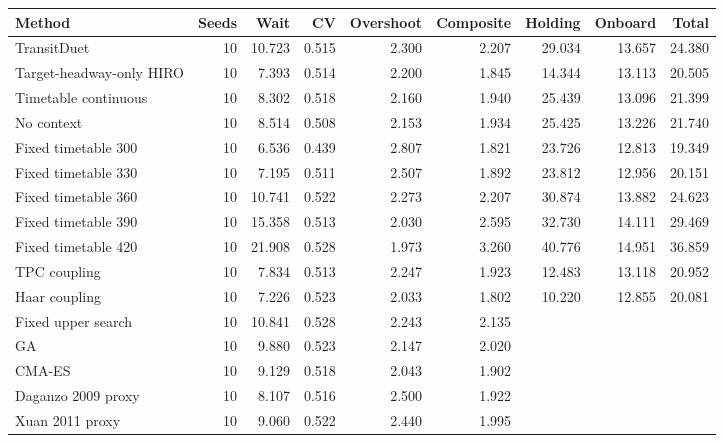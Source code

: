 \begin{tabular}{lrrrrrrrr}
\toprule
Method & Seeds & Wait & CV & Overshoot & Composite & Holding & Onboard & Total \\
\midrule
TransitDuet & 10 & 10.723 & 0.515 & 2.300 & 2.207 & 29.034 & 13.657 & 24.380 \\
Target-headway-only HIRO & 10 & 7.393 & 0.514 & 2.200 & 1.845 & 14.344 & 13.113 & 20.505 \\
Timetable continuous & 10 & 8.302 & 0.518 & 2.160 & 1.940 & 25.439 & 13.096 & 21.399 \\
No context & 10 & 8.514 & 0.508 & 2.153 & 1.934 & 25.425 & 13.226 & 21.740 \\
Fixed timetable 300 & 10 & 6.536 & 0.439 & 2.807 & 1.821 & 23.726 & 12.813 & 19.349 \\
Fixed timetable 330 & 10 & 7.195 & 0.511 & 2.507 & 1.892 & 23.812 & 12.956 & 20.151 \\
Fixed timetable 360 & 10 & 10.741 & 0.522 & 2.273 & 2.207 & 30.874 & 13.882 & 24.623 \\
Fixed timetable 390 & 10 & 15.358 & 0.513 & 2.030 & 2.595 & 32.730 & 14.111 & 29.469 \\
Fixed timetable 420 & 10 & 21.908 & 0.528 & 1.973 & 3.260 & 40.776 & 14.951 & 36.859 \\
TPC coupling & 10 & 7.834 & 0.513 & 2.247 & 1.923 & 12.483 & 13.118 & 20.952 \\
Haar coupling & 10 & 7.226 & 0.523 & 2.033 & 1.802 & 10.220 & 12.855 & 20.081 \\
Fixed upper search & 10 & 10.841 & 0.528 & 2.243 & 2.135 &  &  &  \\
GA & 10 & 9.880 & 0.523 & 2.147 & 2.020 &  &  &  \\
CMA-ES & 10 & 9.129 & 0.518 & 2.043 & 1.902 &  &  &  \\
Daganzo 2009 proxy & 10 & 8.107 & 0.516 & 2.500 & 1.922 &  &  &  \\
Xuan 2011 proxy & 10 & 9.060 & 0.522 & 2.440 & 1.995 &  &  &  \\
\bottomrule
\end{tabular}
